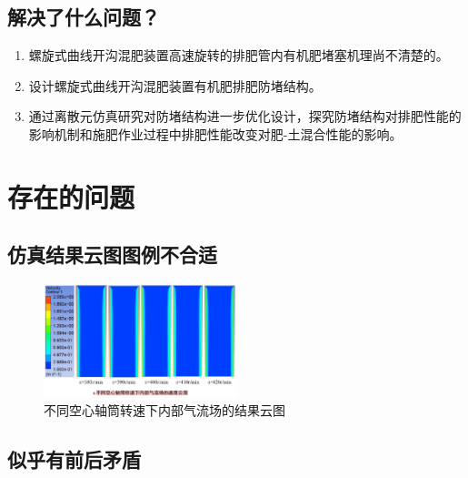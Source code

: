 \documentclass{article}
\begin{document}
\subsection{解决了什么问题？}

\begin{enumerate}
	\item 螺旋式曲线开沟混肥装置高速旋转的排肥管内有机肥堵塞机理尚不清楚的。
	\item 设计螺旋式曲线开沟混肥装置有机肥排肥防堵结构。
	\item 通过离散元仿真研究对防堵结构进一步优化设计，探究防堵结构对排肥性能的影响机制和施肥作业过程中排肥性能改变对肥-土混合性能的影响。
\end{enumerate}

\section{存在的问题}

\subsection{仿真结果云图图例不合适}

\begin{tcolorbox}
	\begin{figure}[H]
		\centering
		\includegraphics[width=0.5\textwidth]{../assets/不同空心轴筒转速下内部气流场的速度云图.png}
		\caption{不同空心轴筒转速下内部气流场的结果云图}
	\end{figure}
\end{tcolorbox}

\subsection{似乎有前后矛盾}
\end{document}
